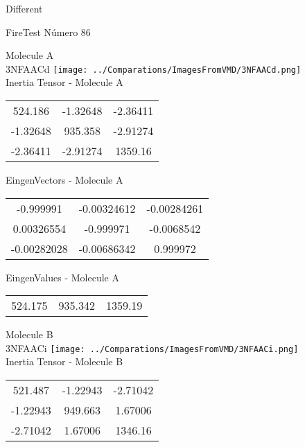 \begin{center}
\vtab
\vtab
\textcolor{NavyBlue}{\Large Different}
\end{center}

 \newpage

\vtab[-2cm]
\begin{center}
{\large FireTest \tab Número 86}
\end{center}
\begin{multicols}{2}
\begin{center}

Molecule A \\ 
3NFAACd
\texttt{[image: ../Comparations/ImagesFromVMD/3NFAACd.png]}
\\
Inertia Tensor - Molecule A \\
\vtab

\begin{tabular}{|c c c|}
524.186	 & 	-1.32648	 & 	-2.36411	 \\
-1.32648	 & 	935.358	 & 	-2.91274	 \\
-2.36411	 & 	-2.91274	 & 	1359.16
\end{tabular}

\vtab
 EingenVectors - Molecule A     \\
\vtab
\begin{tabular}{|c c c|}
-0.999991	 & 	-0.00324612	 & 	-0.00284261	 \\
0.00326554	 & 	-0.999971	 & 	-0.0068542	 \\
-0.00282028	 & 	-0.00686342	 & 	0.999972
\end{tabular}

\vtab
 EingenValues - Molecule A     \\
\vtab
\begin{tabular}{|c c c|}
524.175	 & 	935.342	 & 	1359.19	 \\
\end{tabular}
\columnbreak

Molecule B \\ 
3NFAACi
\texttt{[image: ../Comparations/ImagesFromVMD/3NFAACi.png]}
\\
Inertia Tensor - Molecule B \\
\vtab

\begin{tabular}{|c c c|}
521.487	 & 	-1.22943	 & 	-2.71042	 \\
-1.22943	 & 	949.663	 & 	1.67006	 \\
-2.71042	 & 	1.67006	 & 	1346.16
\end{tabular}


\end{center}
\end{multicols}
